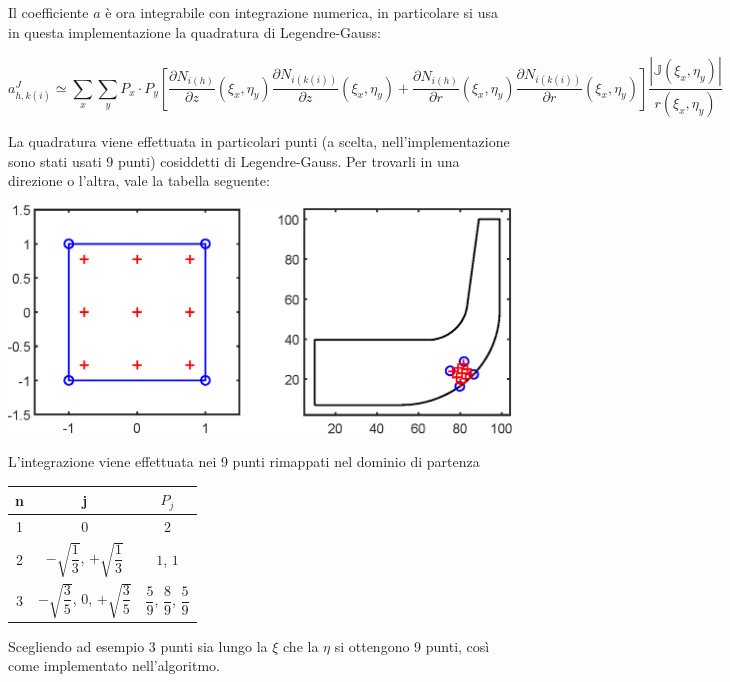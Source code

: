 \documentclass{tufte-handout}
\newcommand{\de}[2]{\dfrac{\partial #1}{\partial #2}}
\begin{document}
Il coefficiente $a$ è ora integrabile con integrazione numerica, in particolare si usa in questa implementazione la quadratura di Legendre-Gauss:
\begin{fullwidth}
\begin{equation}
    a_{h,k(i)}^J \simeq 
    \sum_x \sum_y P_x \cdot P_y \left[
          \de{N_{i(h)}}{z}(\xi_x,\eta_y) \de{N_{i(k(i))}}{z}(\xi_x,\eta_y)
        + \de{N_{i(h)}}{r}(\xi_x,\eta_y) \de{N_{i(k(i))}}{r}(\xi_x,\eta_y)
    \right] \frac{|\mathbb{J}(\xi_x, \eta_y) |}{r(\xi_x,\eta_y)}
\end{equation}
\end{fullwidth}

La quadratura viene effettuata in particolari punti (a scelta, nell'implementazione sono stati usati 9 punti) cosiddetti di Legendre-Gauss. Per trovarli in una direzione o l'altra, vale la tabella seguente:

\begin{marginfigure}[15mm]%
  \includegraphics[width=\linewidth]{fem/mappatura_gauss.eps}
  \caption{L'integrazione viene effettuata nei 9 punti rimappati nel dominio di partenza}
  \label{fig:mappaturagauss}
\end{marginfigure}

\begin{center}
    \begin{tabular}{ c | c | c }
      n & j & $P_j$  \\ \hline
      1 & 0 & $2$ \\
      2 & $-\sqrt{\dfrac{1}{3}}$, $+\sqrt{\dfrac{1}{3}}$ & $1$, $1$\\
      3 & $-\sqrt{\dfrac{3}{5}}$, $0$, $+\sqrt{\dfrac{3}{5}}$ & $\dfrac{5}{9}$, $\dfrac{8}{9}$, $\dfrac{5}{9}$ 
    \end{tabular}
\end{center}



Scegliendo ad esempio 3 punti sia lungo la $\xi$ che la $\eta$ si ottengono 9 punti, così come implementato nell'algoritmo.
\end{document}

